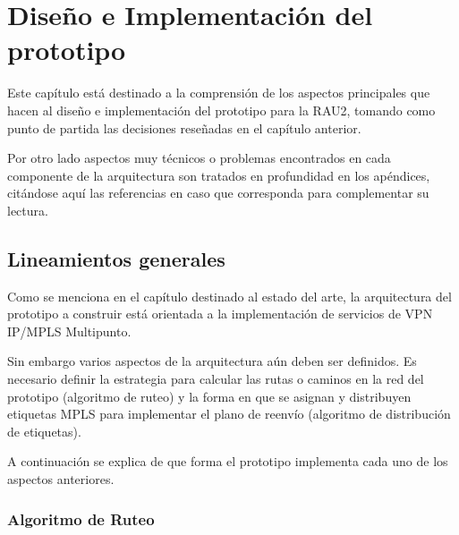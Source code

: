 \chapter{Dise\~no e Implementaci\'on del prototipo}

\ifpdf
    \graphicspath{{Chapter4/Figs/Raster/}{Chapter4/Figs/PDF/}{Chapter4/Figs/}}
\else
    \graphicspath{{Chapter4/Figs/Vector/}{Chapter4/Figs/}}
\fi

Este cap\'itulo est\'a destinado a la comprensi\'on de los aspectos principales que hacen al dise\~no e implementaci\'on del prototipo para la RAU2, tomando como punto de partida las decisiones reseñadas en el cap\'itulo anterior.


Por otro lado aspectos muy t\'ecnicos o problemas encontrados en cada componente de la arquitectura son tratados en profundidad en los ap\'endices, citándose aquí las referencias en caso que corresponda para complementar su lectura.\\

\section[Lineamientos generales]{Lineamientos generales}

Como se menciona en el cap\'itulo destinado al estado del arte, la arquitectura del prototipo a construir est\'a orientada a la implementaci\'on de servicios de VPN IP/MPLS Multipunto.

Sin embargo varios aspectos de la arquitectura a\'un deben ser definidos. Es necesario definir la estrategia para calcular las rutas o caminos en la red del prototipo (algoritmo de ruteo) y la forma en que se asignan y distribuyen etiquetas MPLS para implementar el plano de reenvío (algoritmo de distribución de etiquetas). 

A continuaci\'on se explica de que forma el prototipo implementa cada uno de los aspectos anteriores.

\subsection{Algoritmo de Ruteo}

